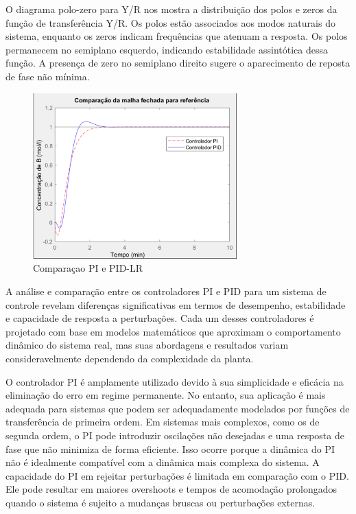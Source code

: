 \documentclass[a4paper,12pt]{article}
\begin{document}
O diagrama polo-zero para Y/R nos mostra a distribuição dos polos e zeros da função de transferência Y/R. Os polos estão associados aos modos naturais do sistema, enquanto os zeros indicam frequências que atenuam a resposta. Os polos permanecem no semiplano esquerdo, indicando estabilidade assintótica dessa função. A presença de zero no semiplano direito sugere o aparecimento de reposta de fase não mínima.

\begin{figure}[H]
    \centering %
    \includegraphics[width=0.7\textwidth]{Imagens/1B/1BComparacaoPILR.png} %
    \caption{Comparaçao PI e PID-LR}
\end{figure}

A análise e comparação entre os controladores PI e PID para um sistema de controle revelam diferenças significativas em termos de desempenho, estabilidade e capacidade de resposta a perturbações. Cada um desses controladores é projetado com base em modelos matemáticos que aproximam o comportamento dinâmico do sistema real, mas suas abordagens e resultados variam consideravelmente dependendo da complexidade da planta.

O controlador PI é amplamente utilizado devido à sua simplicidade e eficácia na eliminação do erro em regime permanente. No entanto, sua aplicação é mais adequada para sistemas que podem ser adequadamente modelados por funções de transferência de primeira ordem. Em sistemas mais complexos, como os de segunda ordem, o PI pode introduzir oscilações não desejadas e uma resposta de fase que não minimiza de forma eficiente. Isso ocorre porque a dinâmica do PI não é idealmente compatível com a dinâmica mais complexa do sistema. A capacidade do PI em rejeitar perturbações é limitada em comparação com o PID. Ele pode resultar em maiores overshoots e tempos de acomodação prolongados quando o sistema é sujeito a mudanças bruscas ou perturbações externas.
\end{document}
